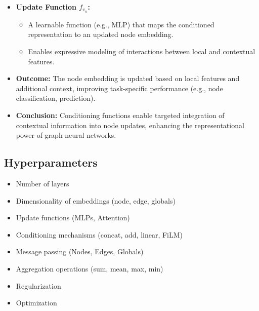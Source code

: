 \begin{notes}
\begin{itemize}
        \item \textbf{Update Function \(f_{v_n}\):}
        \begin{itemize}
            \item A learnable function (e.g., MLP) that maps the conditioned representation to an updated node embedding.
            \item Enables expressive modeling of interactions between local and contextual features.
        \end{itemize}
    
        \item \textbf{Outcome:} The node embedding is updated based on local features and additional context, improving task-specific performance (e.g., node classification, prediction).
    
        \item \textbf{Conclusion:} Conditioning functions enable targeted integration of contextual information into node updates, enhancing the representational power of graph neural networks.
    \end{itemize}    
\end{notes}

\subsection{Hyperparameters}
\begin{notes}
    \begin{itemize}
        \item Number of layers
        \item Dimensionality of embeddings (node, edge, globals)
        \item Update functions (MLPs, Attention)
        \item Conditioning mechanisms (concat, add, linear, FiLM)
        \item Message passing (Nodes, Edges, Globals)
        \item Aggregation operations (sum, mean, max, min)
        \item Regularization
        \item Optimization
    \end{itemize}
\end{notes}